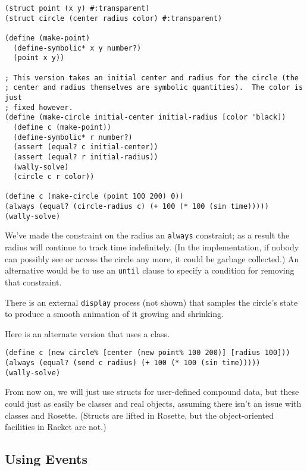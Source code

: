 \documentclass{article}
\begin{document}
\begin{verbatim}
(struct point (x y) #:transparent)
(struct circle (center radius color) #:transparent)

(define (make-point)
  (define-symbolic* x y number?)
  (point x y))

; This version takes an initial center and radius for the circle (the
; center and radius themselves are symbolic quantities).  The color is just
; fixed however.
(define (make-circle initial-center initial-radius [color 'black])
  (define c (make-point))
  (define-symbolic* r number?)
  (assert (equal? c initial-center))
  (assert (equal? r initial-radius))
  (wally-solve)
  (circle c r color))

(define c (make-circle (point 100 200) 0))
(always (equal? (circle-radius c) (+ 100 (* 100 (sin time)))))
(wally-solve)
\end{verbatim}

We've made the constraint on the radius an \verb|always| constraint;
as a result the radius will continue to track time indefinitely.  (In
the implementation, if nobody can possibly see or access the circle
any more, it could be garbage collected.)  An alternative would be to
use an \verb|until| clause to specify a condition for removing that
constraint.

There is an external \verb|display| process (not shown) that samples
the circle's state to produce a smooth animation of it growing and
shrinking.

Here is an alternate version that uses a class.

\begin{verbatim}
(define c (new circle% [center (new point% 100 200)] [radius 100]))
(always (equal? (send c radius) (+ 100 (* 100 (sin time)))))
(wally-solve)
\end{verbatim}

From now on, we will just use structs for user-defined compound data,
but these could just as easily be classes and real objects, assuming
there isn't an issue with classes and Rosette.  (Structs are lifted in
Rosette, but the object-oriented facilities in Racket are not.)

\subsection{Using Events}

\end{document}
